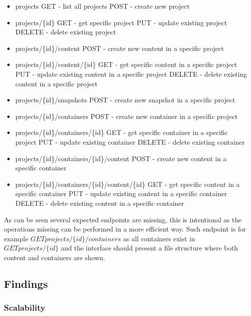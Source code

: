 \documentclass[a4paper,12pt]{article}
\begin{document}
\begin{itemize}
  \item projects
      \subitem GET - list all projects
      \subitem POST - create new project
  \item projects/\{id\}
      \subitem GET - get specific project
      \subitem PUT - update existing project
      \subitem DELETE - delete existing project
  \item projects/\{id\}/content
      \subitem POST - create new content in a specific project 
  \item projects/\{id\}/content/\{id\}
      \subitem GET - get specific content in a specific project
      \subitem PUT - update existing content in a specific project
      \subitem DELETE - delete existing content in a specific project

  \item projects/\{id\}/snapshots
      \subitem POST - create new snapshot in a specific project 

  \item projects/\{id\}/containers
      \subitem POST - create new container in a specific project 
  \item projects/\{id\}/containers/\{id\}
      \subitem GET - get specific container in a specific project
      \subitem PUT - update existing container
      \subitem DELETE - delete existing container
  \item projects/\{id\}/containers/\{id\}/content
      \subitem POST - create new content in a specific container 
  \item projects/\{id\}/containers/\{id\}/content/\{id\}
      \subitem GET - get specific content in a specific container
      \subitem PUT - update existing content in a specific container
      \subitem DELETE - delete existing content in a specific container
\end{itemize}

As can be seen several expected endpoints are missing, this is intentional as the operations missing can be performed in 
a more efficient way. Such endpoint is for example $GET projects/\{id\}/containers$ as all containers exist in 
$GET projects/\{id\}$ and the interface should present a file structure where both content and containers are shown.

\subsection{Findings}
\subsubsection{Scalability}
\end{document}
